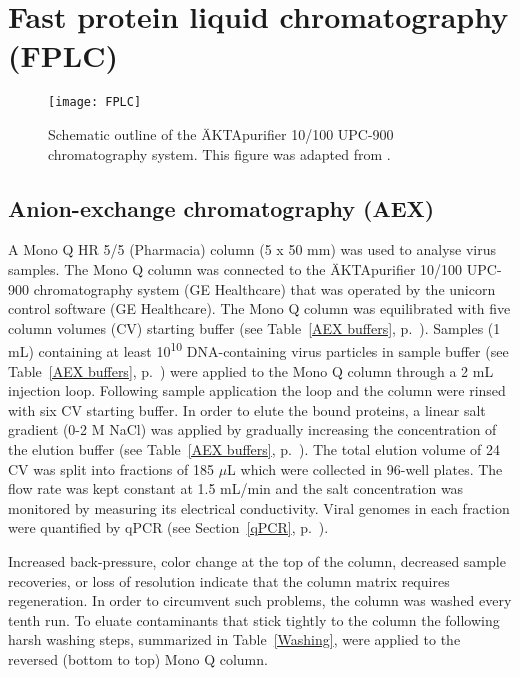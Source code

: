 \section{Fast protein liquid chromatography (FPLC)}
\label{ÄKTA}

\begin{figure}[H]
\centering
  \texttt{[image: FPLC]}
  \caption[Schematic outline of the ÄKTA chromatography system]
   {Schematic outline of the ÄKTApurifier 10/100 UPC-900 chromatography system. This figure was adapted from \cite{pmid20978981}.} 
\label{FPLC}
\end{figure}


\subsection{Anion-exchange chromatography (AEX)}
\label{AEX}
A Mono Q\textsuperscript{\texttrademark} HR 5/5 (Pharmacia) column (5 x 50 mm) was used to analyse virus samples. The Mono Q column was connected to the ÄKTApurifier 10/100 UPC-900 chromatography system (GE Healthcare) that was operated by the unicorn control software (GE Healthcare). The Mono Q\textsuperscript{\texttrademark} column was equilibrated with five column volumes (CV) starting buffer (see Table~\ref{AEX buffers}, p.~\pageref{AEX buffers}). Samples (1 mL) containing at least 10\textsuperscript{10} DNA-containing virus particles in sample buffer (see Table~\ref{AEX buffers}, p.~\pageref{AEX buffers}) were applied to the Mono Q\textsuperscript{\texttrademark} column through a 2 mL injection loop. Following sample application the loop and the column were rinsed with six CV starting buffer. In order to elute the bound proteins, a linear salt gradient (0-2 M NaCl) was applied by gradually increasing the concentration of the elution buffer (see Table~\ref{AEX buffers}, p.~\pageref{AEX buffers}). The total elution volume of 24 CV was split into fractions of 185 $\mu$L which were collected in 96-well plates. The flow rate was kept constant at 1.5 mL/min and the salt concentration was monitored by measuring its electrical conductivity. Viral genomes in each fraction were quantified by qPCR (see Section~\ref{qPCR}, p.~\pageref{qPCR}).  

Increased back-pressure, color change at the top of the column, decreased sample recoveries, or loss of resolution indicate that the column matrix requires regeneration. In order to circumvent such problems, the column was washed every tenth run. To eluate contaminants that stick tightly to the column the following harsh washing steps, summarized in Table~\ref{Washing}, were applied to the reversed (bottom to top) Mono Q\textsuperscript{\texttrademark} column. 

